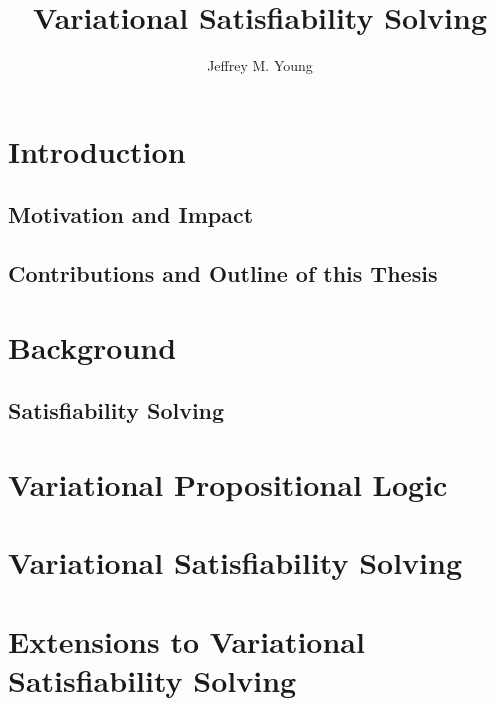\documentclass[onehalf,11pt]{beavtex}
\title{Variational Satisfiability Solving}
\author{Jeffrey M. Young}
\begin{document}
\maketitle

\mainmatter{}

\listoftodos{}

\chapter{Introduction}


\section{Motivation and Impact}


\section{Contributions and Outline of this Thesis}

\chapter{Background}

\section{Satisfiability Solving}

\chapter{Variational Propositional Logic}

\chapter{Variational Satisfiability Solving}

\chapter{Extensions to Variational Satisfiability Solving}
\end{document}
